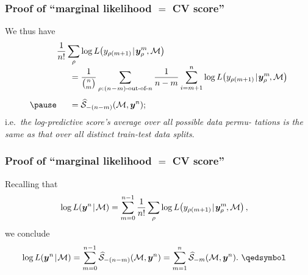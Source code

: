 \documentclass[18pt]{beamer}
\newcommand{\defineTightSpacing}{%
	\setlength{\abovedisplayskip}{.25\baselineskip}%
	\setlength{\belowdisplayskip}{.25\baselineskip}%
}
\newcommand{\given}{\thinnerspace | \thinnerspace}
\newcommand{\spacedColon}{\mkern .5mu : \mkern 1mu}
\newcommand{\thinnerspace}{\mskip.5\thinmuskip}
\newcommand{\negthinnerspace}{\mskip-.5\thinmuskip}
\newcommand{\likelihood}{L}
\newcommand{\by}{\bm{y}}
\newcommand{\score}{\mathcal{S}}
\newcommand{\modelSymbol}{\mathcal{M}}
\newcommand{\permutation}{\rho}
\newcommand{\trainingSize}{m}
\newcommand{\testSampleIndex}{i}
\begin{document}
\begin{frame}
\frametitle{Proof of ``marginal likelihood $=$ {\large CV} score''}
We thus have
\begin{equation*} %
\begin{aligned}
&\frac{1}{n!} \sum_\permutation \log \likelihood\!\left(y_{\permutation(\trainingSize + 1)} \given \by_\permutation^\trainingSize\negthinnerspace, \modelSymbol \right) \\[-.25\baselineskip]
&\hspace*{1.5em}= \frac{1}{{n \choose \trainingSize}} \sum_{\permutation \spacedColon \text{$(n\!-\!\trainingSize)$-out-of-$n$}} 
	\frac{1}{n - \trainingSize} \sum_{\testSampleIndex = \trainingSize + 1}^n
		\log \likelihood\!\left(y_{\permutation(\trainingSize + 1)} \given \by_\permutation^\trainingSize\negthinnerspace, \modelSymbol \right) \\[.25\baselineskip]
\pause
&\hspace*{1.5em}= \widehat{\score}_{-(n - \trainingSize)}(\modelSymbol, \by^n);
\end{aligned}
\end{equation*}
\pause%
i.e.\ \textit{the log-predictive score's average over all possible data permu- tations is the same as that over all distinct train-test data splits}.
\end{frame}


\begin{frame}
\frametitle{Proof of ``marginal likelihood $=$ {\large CV} score''}
Recalling that
\begin{equation*} \defineTightSpacing%
\begin{aligned}
\log \likelihood(\by^n \given \modelSymbol)
	&= \sum_{\trainingSize = 0}^{n - 1} \frac{1}{n!} \sum_\permutation  \log \likelihood\!\left(y_{\permutation(\trainingSize + 1)} \given \by_\permutation^\trainingSize\negthinnerspace, \modelSymbol \right),
\end{aligned}
\end{equation*}
\pause
we conclude
\begin{equation*} \defineTightSpacing%
\begin{aligned}
\log \likelihood(\by^n \given \modelSymbol)
	&= \sum_{\trainingSize = 0}^{n - 1} \widehat{\score}_{-(n - \trainingSize)}(\modelSymbol, \by^n)
	= \sum_{\trainingSize = 1}^{n} \widehat{\score}_{-\trainingSize}(\modelSymbol, \by^n). \ \qedsymbol
\end{aligned}
\end{equation*}
\end{frame}


\end{document}
